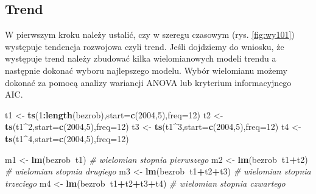 \documentclass[polish,]{book}
\newenvironment{Shaded}{\begin{snugshade}}{\end{snugshade}}
\newcommand{\CommentTok}[1]{\textcolor[rgb]{0.56,0.35,0.01}{\textit{#1}}}
\newcommand{\DataTypeTok}[1]{\textcolor[rgb]{0.13,0.29,0.53}{#1}}
\newcommand{\DecValTok}[1]{\textcolor[rgb]{0.00,0.00,0.81}{#1}}
\newcommand{\KeywordTok}[1]{\textcolor[rgb]{0.13,0.29,0.53}{\textbf{#1}}}
\newcommand{\NormalTok}[1]{#1}
\newcommand{\OperatorTok}[1]{\textcolor[rgb]{0.81,0.36,0.00}{\textbf{#1}}}
\newcommand{\StringTok}[1]{\textcolor[rgb]{0.31,0.60,0.02}{#1}}
\begin{document}
\hypertarget{part_10.2.1}{%
\subsection{Trend}\label{part_10.2.1}}

W pierwszym kroku należy ustalić, czy w szeregu czasowym (rys. \ref{fig:wy101}) występuje tendencja rozwojowa czyli trend. Jeśli dojdziemy do wniosku, że występuje
trend należy zbudować kilka wielomianowych modeli trendu a następnie dokonać wyboru najlepszego modelu. Wybór wielomianu możemy dokonać za pomocą analizy
wariancji ANOVA lub kryterium informacyjnego AIC.

\begin{Shaded}
\begin{Highlighting}[]
\NormalTok{t1 <-}\StringTok{ }\KeywordTok{ts}\NormalTok{(}\DecValTok{1}\OperatorTok{:}\KeywordTok{length}\NormalTok{(bezrob),}\DataTypeTok{start=}\KeywordTok{c}\NormalTok{(}\DecValTok{2004}\NormalTok{,}\DecValTok{5}\NormalTok{),}\DataTypeTok{freq=}\DecValTok{12}\NormalTok{)}
\NormalTok{t2 <-}\StringTok{ }\KeywordTok{ts}\NormalTok{(t1}\OperatorTok{^}\DecValTok{2}\NormalTok{,}\DataTypeTok{start=}\KeywordTok{c}\NormalTok{(}\DecValTok{2004}\NormalTok{,}\DecValTok{5}\NormalTok{),}\DataTypeTok{freq=}\DecValTok{12}\NormalTok{)}
\NormalTok{t3 <-}\StringTok{ }\KeywordTok{ts}\NormalTok{(t1}\OperatorTok{^}\DecValTok{3}\NormalTok{,}\DataTypeTok{start=}\KeywordTok{c}\NormalTok{(}\DecValTok{2004}\NormalTok{,}\DecValTok{5}\NormalTok{),}\DataTypeTok{freq=}\DecValTok{12}\NormalTok{)}
\NormalTok{t4 <-}\StringTok{ }\KeywordTok{ts}\NormalTok{(t1}\OperatorTok{^}\DecValTok{4}\NormalTok{,}\DataTypeTok{start=}\KeywordTok{c}\NormalTok{(}\DecValTok{2004}\NormalTok{,}\DecValTok{5}\NormalTok{),}\DataTypeTok{freq=}\DecValTok{12}\NormalTok{)}
\end{Highlighting}
\end{Shaded}

\begin{Shaded}
\begin{Highlighting}[]
\NormalTok{m1 <-}\StringTok{ }\KeywordTok{lm}\NormalTok{(bezrob}\OperatorTok{~}\NormalTok{t1)          }\CommentTok{# wielomian stopnia pierwszego}
\NormalTok{m2 <-}\StringTok{ }\KeywordTok{lm}\NormalTok{(bezrob}\OperatorTok{~}\NormalTok{t1}\OperatorTok{+}\NormalTok{t2)       }\CommentTok{# wielomian stopnia drugiego}
\NormalTok{m3 <-}\StringTok{ }\KeywordTok{lm}\NormalTok{(bezrob}\OperatorTok{~}\NormalTok{t1}\OperatorTok{+}\NormalTok{t2}\OperatorTok{+}\NormalTok{t3)    }\CommentTok{# wielomian stopnia trzeciego}
\NormalTok{m4 <-}\StringTok{ }\KeywordTok{lm}\NormalTok{(bezrob}\OperatorTok{~}\NormalTok{t1}\OperatorTok{+}\NormalTok{t2}\OperatorTok{+}\NormalTok{t3}\OperatorTok{+}\NormalTok{t4) }\CommentTok{# wielomian stopnia czwartego}
\end{Highlighting}
\end{Shaded}
\end{document}
